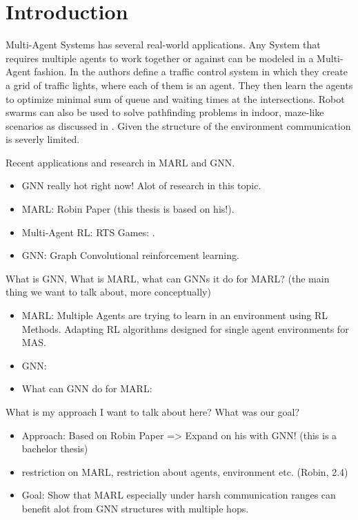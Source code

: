 
\chapter{Introduction}
Multi-Agent Systems has several real-world applications. Any System that requires multiple agents to work together or against can be modeled in a Multi-Agent fashion. In \citet{MARLTraffic2020} the authors define a traffic control system in which they create a grid of traffic lights, where each of them is an agent. They then learn the agents to optimize minimal sum of queue and waiting times at the intersections. Robot swarms can also be used to solve pathfinding problems in indoor, maze-like scenarios as discussed in \citet{SwarmPathFinding2013}. Given the structure of the environment communication is severly limited. 
\par

Recent applications and research in MARL and GNN.
\begin{itemize}[noitemsep,nolistsep]
	\item GNN really hot right now! Alot of research in this topic.
	\item MARL: Robin Paper (this thesis is based on his!). 
	\item Multi-Agent RL: RTS Games: \citet{RTSMARL2021}.
	\item GNN: Graph Convolutional reinforcement learning.
\end{itemize} \par

What is GNN, What is MARL, what can GNNs it do for MARL? (the main thing we want to talk about, more conceptually)
\begin{itemize}[noitemsep,nolistsep]
	\item MARL: Multiple Agents are trying to learn in an environment using RL Methods. Adapting RL algorithms designed for single agent environments for MAS.
	\item GNN: 
	\item What can GNN do for MARL:
\end{itemize} \par

What is my approach I want to talk about here? What was our goal?
\begin{itemize}[noitemsep,nolistsep]
	\item Approach: Based on Robin Paper => Expand on his with GNN! (this is a bachelor thesis) \citet{RobinRuede2021}
	\item restriction on MARL, restriction about agents, environment etc. (Robin, 2.4)
	\item Goal: Show that MARL especially under harsh communication ranges can benefit alot from GNN structures with multiple hops.
\end{itemize} \par

